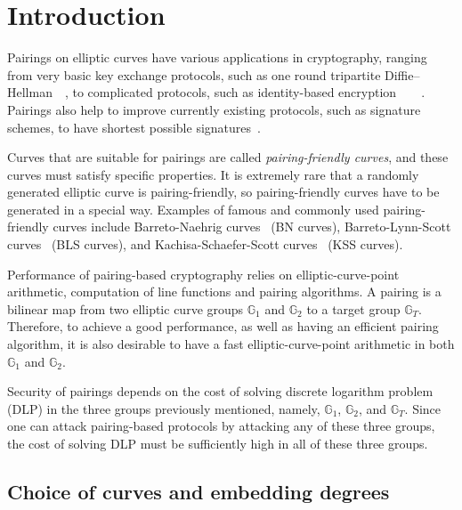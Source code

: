 \section{Introduction}
\label{sec:intro}

Pairings on elliptic curves have various applications in cryptography,
ranging from very basic key exchange protocols,
such as one round tripartite Diffie--Hellman~\cite{2000/joux-ants}~\cite{2004/joux-tripartite},
to complicated protocols, such as
identity-based encryption~\cite{2001/boneh}~\cite{2002/horwitz}~\cite{2002/gentry}~\cite{2005/sahai}.
Pairings also help to improve currently existing protocols, 
such as signature schemes, to have shortest possible signatures~\cite{2004/boneh}.

Curves that are suitable for pairings are called {\emph{pairing-friendly curves}},
and these curves must satisfy specific properties.
It is extremely rare that a randomly generated elliptic curve is pairing-friendly,
so pairing-friendly curves have to be generated in a special way.
Examples of famous and commonly used pairing-friendly curves include 
Barreto-Naehrig curves~\cite{2006/barreto} (BN curves),
Barreto-Lynn-Scott curves~\cite{2003/bls} (BLS curves), and
Kachisa-Schaefer-Scott curves~\cite{2008/kss} (KSS curves).

Performance of pairing-based cryptography relies on
elliptic-curve-point arithmetic, computation of line functions and pairing algorithms.
A pairing is a bilinear map from two elliptic curve groups $\mathbb{G}_1$ and $\mathbb{G}_2$ to
a target group $\mathbb{G}_T$.
Therefore, to achieve a good performance, as well as having an efficient pairing algorithm,
it is also desirable to have a fast elliptic-curve-point arithmetic in both $\mathbb{G}_1$ and $\mathbb{G}_2$.

Security of pairings depends on the cost of solving discrete logarithm problem (DLP) in the three groups previously mentioned,
namely, $\mathbb{G}_1$, $\mathbb{G}_2$, and $\mathbb{G}_T$.
Since one can attack pairing-based protocols by attacking any of these three groups,
the cost of solving DLP must be sufficiently high in all of these three groups.


\subsection{Choice of curves and embedding degrees}

